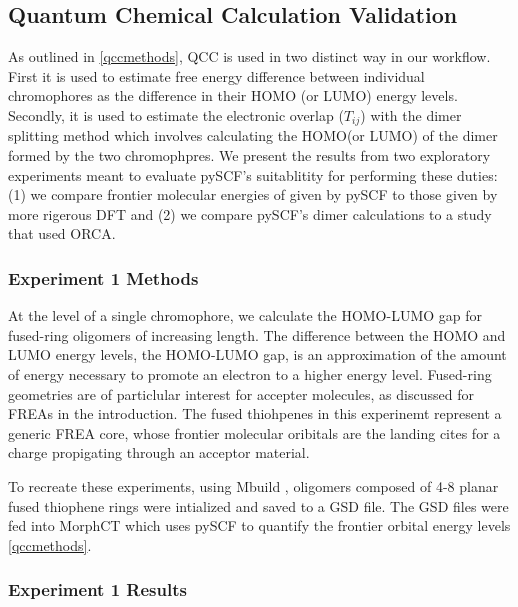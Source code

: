 \label{validation}

\subsection{Quantum Chemical Calculation Validation}

As outlined in \autoref{qccmethods}, QCC is used in two distinct way in our workflow. 
First it is used to estimate free energy
difference between individual chromophores as the difference in their HOMO (or LUMO) energy levels.
Secondly, it is used to estimate the electronic overlap ($T_{ij}$) with the dimer splitting method which involves
calculating the HOMO(or LUMO) of the dimer formed by the two chromophpres. We present the results from two
exploratory experiments meant to evaluate pySCF's suitablitity for performing these duties:
 (1) we compare frontier molecular energies of given by pySCF to those
given by more rigerous DFT and (2) we compare pySCF's dimer calculations to a study that used ORCA.  


\subsubsection{Experiment 1 Methods}

At the level of a single chromophore, we calculate the HOMO-LUMO gap for fused-ring
oligomers of increasing length. 
The difference between the HOMO and LUMO energy levels, the HOMO-LUMO gap, is an approximation of the amount
of energy necessary to promote an electron to a higher energy level.  
Fused-ring geometries are of particlular interest for accepter
molecules, as discussed for FREAs in the introduction. 
The fused thiohpenes in this experinemt represent a generic FREA core, whose frontier molecular oribitals are
the landing cites for a charge propigating through an acceptor material. 

To recreate these experiments, using Mbuild \cite{Klein2016}, oligomers composed of 4-8 planar fused thiophene rings
were intialized and saved to a GSD file. The GSD files were fed into MorphCT which uses pySCF to quantify the
frontier orbital energy levels \autoref{qccmethods}.

\subsubsection{Experiment 1 Results}

